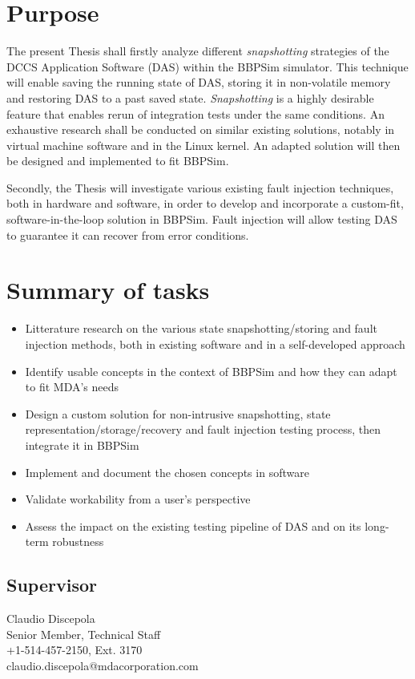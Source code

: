 \documentclass[12pt,english]{rftthesis}
\begin{document}
%
%
\section*{Purpose}\label{sec:purpose}
The present Thesis shall firstly analyze different \textit{snapshotting} strategies of the DCCS Application Software (DAS) within the BBPSim simulator. This technique will enable saving the running state of DAS, storing it in non-volatile memory and restoring DAS to a past saved state. \textit{Snapshotting} is a highly desirable feature that enables rerun of integration tests under the same conditions. An exhaustive research shall be conducted on similar existing solutions, notably in virtual machine software and in the Linux kernel. An adapted solution will then be designed and implemented to fit BBPSim. 

Secondly, the Thesis will investigate various existing fault injection techniques, both in hardware and software, in order to develop and incorporate a custom-fit, software-in-the-loop solution in BBPSim. Fault injection will allow testing DAS to guarantee it can recover from error conditions.
%
%
\section*{Summary of tasks}\label{sec:tasks}
\begin{itemize}
\item Litterature research on the various state snapshotting/storing and fault injection methods, both in existing software and in a self-developed approach
\item Identify usable concepts in the context of BBPSim and how they can adapt to fit MDA's needs 
\item Design a custom solution for non-intrusive snapshotting, state representation/storage/recovery and fault injection testing process, then integrate it in BBPSim
\item Implement and document the chosen concepts in software
\item Validate workability from a user's perspective
\item Assess the impact on the existing testing pipeline of DAS and on its long-term robustness
\end{itemize}

\subsection*{Supervisor}
\begin{spacing}{1}
Claudio Discepola\\
Senior Member, Technical Staff\\
+1-514-457-2150, Ext. 3170\\
claudio.discepola@mdacorporation.com
\end{spacing}
\end{document}
